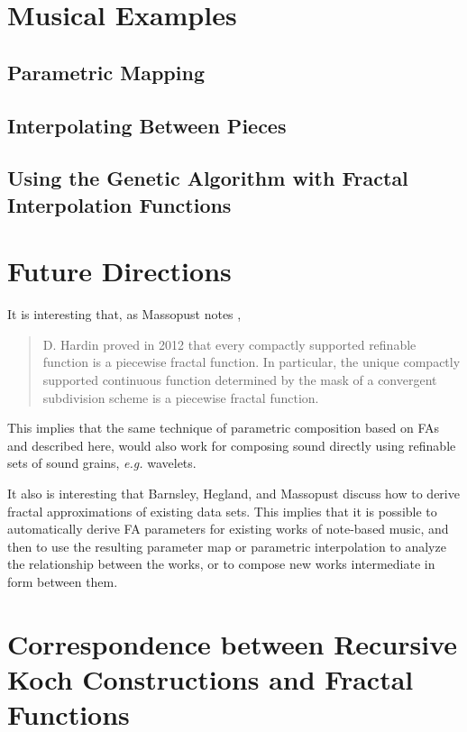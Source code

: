\documentclass[english,11pt,letterpaper,onecolumn]{scrartcl}
\numberwithin{equation}{section}
\begin{document}
\section{Musical Examples}

\subsection{Parametric Mapping}


\subsection{Interpolating Between Pieces}


\subsection{Using the Genetic Algorithm with Fractal Interpolation
Functions}

\section{Future Directions}

It is interesting that, as Massopust notes \cite{massopust2017},
\begin{quote}D. Hardin proved in 2012 that every compactly supported
refinable function is a piecewise fractal function. In particular, the
unique
compactly supported continuous function determined by the mask of a
convergent
subdivision scheme is a piecewise fractal function. \end{quote}
This implies that the same technique of parametric
composition based on FAs and described here, would also work for composing
sound directly using refinable sets of sound grains, \textit{e.g.}
wavelets.

It also is interesting that Barnsley, Hegland, and Massopust
\cite{2013arXiv1309.0972B} discuss how to derive fractal approximations of
existing data sets. This implies that it is possible to automatically
derive
FA parameters for existing works of note-based music, and then to use the
resulting parameter map or parametric interpolation to analyze the
relationship between the works, or to compose new works intermediate in
form
between them.

\section{Correspondence between Recursive Koch Constructions and Fractal Functions}
\end{document}
